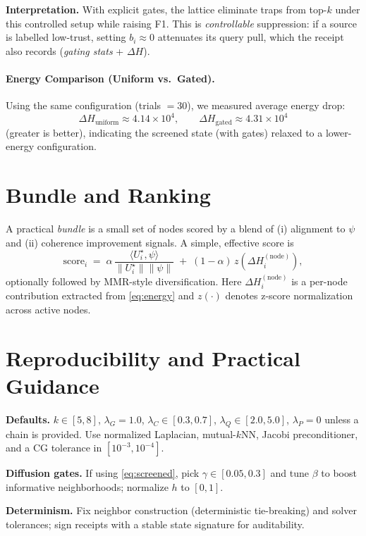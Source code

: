 \documentclass[11pt]{article}
\begin{document}
\noindent
\textbf{Interpretation.} With explicit gates, the lattice eliminate traps from top-$k$ under this controlled setup while raising F1. This is \emph{controllable} suppression: if a source is labelled low-trust, setting $b_i\!\approx 0$ attenuates its query pull, which the receipt also records (\emph{gating stats} + $\Delta H$). 

\paragraph{Energy Comparison (Uniform vs.\ Gated).}
Using the same configuration (trials $=30$), we measured average energy drop:
\[
\Delta H_{\text{uniform}} \approx 4.14{\times}10^4,
\qquad
\Delta H_{\text{gated}} \approx 4.31{\times}10^4
\]
(greater is better), indicating the screened state (with gates) relaxed to a lower-energy configuration.

\vspace{-0.5em}
\section{Bundle and Ranking}
A practical \emph{bundle} is a small set of nodes scored by a blend of (i) alignment to $\psi$ and (ii) coherence improvement signals. A simple, effective score is
\[
\mathrm{score}_i \;=\; \alpha\, \frac{\langle U^\star_i, \psi\rangle}{\|U^\star_i\|\|\psi\|} \;+\;
(1-\alpha)\, z\!\left(\Delta H^{(\text{node})}_i\right),
\]
optionally followed by MMR-style diversification. Here $\Delta H^{(\text{node})}_i$ is a per-node contribution extracted from \eqref{eq:energy} and $z(\cdot)$ denotes z-score normalization across active nodes.

\vspace{-0.5em}
\section{Reproducibility and Practical Guidance}
\textbf{Defaults.} $k\!\in\![5,8]$, $\lambda_G\!=\!1.0$, $\lambda_C\!\in\![0.3,0.7]$, $\lambda_Q\!\in\![2.0,5.0]$, $\lambda_P\!=\!0$ unless a chain is provided. Use normalized Laplacian, mutual-$k$NN, Jacobi preconditioner, and a CG tolerance in $[10^{-3},10^{-4}]$. 

\textbf{Diffusion gates.} If using \eqref{eq:screened}, pick $\gamma\!\in[0.05,0.3]$ and tune $\beta$ to boost informative neighborhoods; normalize $h$ to $[0,1]$. 

\textbf{Determinism.} Fix neighbor construction (deterministic tie-breaking) and solver tolerances; sign receipts with a stable state signature for auditability.
\end{document}
